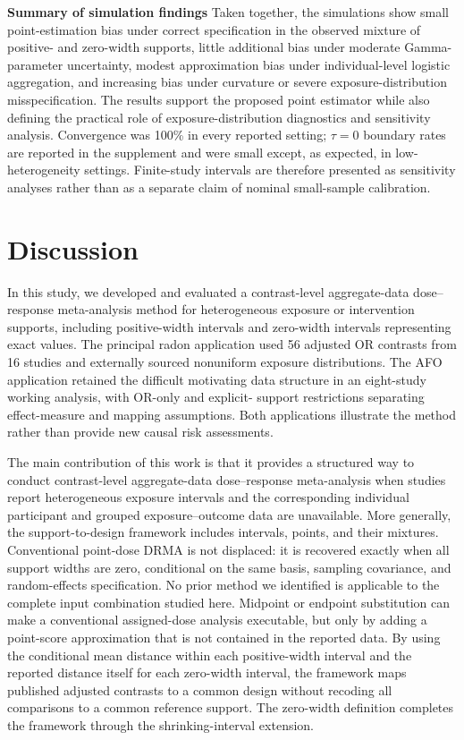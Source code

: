 \documentclass[journal=rsm]{CUP-JNL-DTM}%
\theoremstyle{definition}
\numberwithin{equation}{section}
\begin{document}
\noindent\textbf{Summary of simulation findings}
Taken together, the simulations show small point-estimation bias under correct
specification in the observed mixture of positive- and zero-width supports,
little additional bias under moderate Gamma-parameter uncertainty, modest
approximation bias under individual-level logistic aggregation, and increasing
bias under curvature or severe exposure-distribution misspecification. The
results support the proposed point estimator while also defining the practical
role of exposure-distribution diagnostics and sensitivity analysis. Convergence
was 100\% in every reported setting; $\tau=0$ boundary rates are reported in the
supplement and were small except, as expected, in low-heterogeneity settings.
Finite-study intervals are therefore presented as sensitivity analyses rather
than as a separate claim of nominal small-sample calibration.


\section{Discussion}\label{sec4}
In this study, we developed and evaluated a contrast-level aggregate-data
dose--response meta-analysis method for heterogeneous exposure or intervention
supports, including positive-width intervals and zero-width intervals
representing exact values. The principal radon application used 56 adjusted OR
contrasts from 16 studies and externally sourced nonuniform exposure
distributions. The AFO application retained the difficult motivating data
structure in an eight-study working analysis, with OR-only and explicit-
support restrictions separating effect-measure and mapping assumptions. Both applications illustrate
the method rather than provide new causal risk assessments.

The main contribution of this work is that it provides a structured way to
conduct contrast-level aggregate-data dose--response meta-analysis when
studies report heterogeneous exposure intervals and the corresponding
individual participant and grouped exposure--outcome data are unavailable.
More generally, the support-to-design framework includes intervals, points,
and their mixtures. Conventional
point-dose DRMA is not displaced: it is recovered exactly when all support
widths are zero, conditional on the same basis, sampling covariance, and
random-effects specification. No prior method we identified is applicable to
the complete input combination studied here. Midpoint or endpoint substitution
can make a conventional assigned-dose analysis executable, but only by adding
a point-score approximation that is not contained in the reported data. By
using the conditional mean distance within each positive-width interval and
the reported distance itself for each zero-width interval, the framework maps
published adjusted contrasts to a common design without recoding all
comparisons to a common reference support. The zero-width definition completes
the framework through the shrinking-interval extension.
\end{document}
